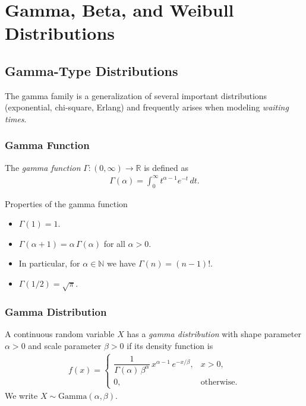 \section{Gamma, Beta, and Weibull Distributions}
\subsection{Gamma-Type Distributions}

The gamma family is a generalization of several important distributions (exponential, chi-square, Erlang) and frequently arises when modeling \emph{waiting times}.

\subsubsection{Gamma Function}

\begin{definicion}
The \emph{gamma function} $\Gamma: (0,\infty) \to \mathbb{R}$ is defined as
\begin{align}
 \label{eq:2.8.6}
 \Gamma(\alpha) = \int_0^\infty t^{\alpha-1} e^{-t}\,dt.
\end{align}
\end{definicion}

{Properties of the gamma function}
\begin{itemize}
 \item $\Gamma(1) = 1$.
 \item $\Gamma(\alpha + 1) = \alpha\,\Gamma(\alpha)$ for all $\alpha > 0$.
 \item In particular, for $\alpha \in \mathbb{N}$ we have $\Gamma(n) = (n-1)!$.
 \item $\Gamma(1/2) = \sqrt{\pi}$.
\end{itemize}

\subsubsection{Gamma Distribution}

\begin{definicion}
A continuous random variable $X$ has a \emph{gamma distribution} with shape parameter $\alpha > 0$ and scale parameter $\beta > 0$ if its density function is
\begin{align}
 \label{eq:2.8.7}
 f(x) =
 \begin{cases}
  \dfrac{1}{\Gamma(\alpha)\,\beta^\alpha}\,x^{\alpha-1}\,e^{-x/\beta},
  & x > 0, \\
  0, & \text{otherwise.}
 \end{cases}
\end{align}
We write $X \sim \text{Gamma}(\alpha, \beta)$.
\end{definicion}

